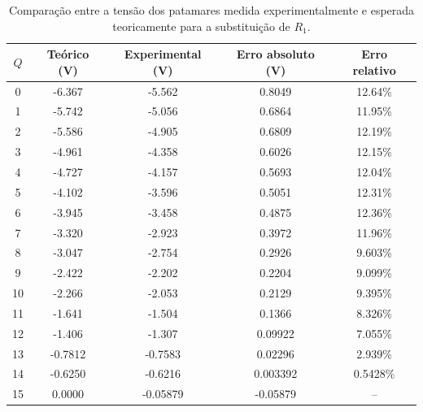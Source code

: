 \documentclass[a4paper, oneside]{article}
\begin{document}
\begin{table}[ht]
	\centering
	\caption{Comparação entre a tensão dos patamares medida experimentalmente e esperada teoricamente para a substituição de $R_1$.}
	\label{tab:Pat_R1_exp}
	\begin{tabular}{ccccc}
		$Q$ & Teórico (V) & Experimental (V) & Erro absoluto (V) & Erro relativo\\
		\hline
		0 & -6.367 & -5.562 & 0.8049 & 12.64\%\\ 
		1 & -5.742 & -5.056 & 0.6864 & 11.95\%\\ 
		2 & -5.586 & -4.905 & 0.6809 & 12.19\%\\ 
		3 & -4.961 & -4.358 & 0.6026 & 12.15\%\\ 
		4 & -4.727 & -4.157 & 0.5693 & 12.04\%\\ 
		5 & -4.102 & -3.596 & 0.5051 & 12.31\%\\ 
		6 & -3.945 & -3.458 & 0.4875 & 12.36\%\\ 
		7 & -3.320 & -2.923 & 0.3972 & 11.96\%\\ 
		8 & -3.047 & -2.754 & 0.2926 & 9.603\%\\ 
		9 & -2.422 & -2.202 & 0.2204 & 9.099\%\\ 
		10 & -2.266 & -2.053 & 0.2129 & 9.395\%\\ 
		11 & -1.641 & -1.504 & 0.1366 & 8.326\%\\ 
		12 & -1.406 & -1.307 & 0.09922 & 7.055\%\\ 
		13 & -0.7812 & -0.7583 & 0.02296 & 2.939\%\\ 
		14 & -0.6250 & -0.6216 & 0.003392 & 0.5428\%\\ 
		15 & 0.0000 & -0.05879 & -0.05879 & -- \\
		\hline
	\end{tabular}
\end{table}
\end{document}
